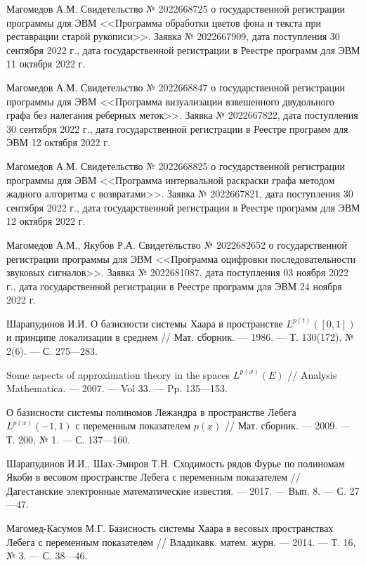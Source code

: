 \begin{thebibliography}{111}
Магомедов А.М.
Свидетельство № 2022668725 о государственной регистрации программы для ЭВМ <<Программа обработки цветов фона и текста при реставрации старой рукописи>>. Заявка № 2022667909, дата поступления 30 сентября 2022 г., дата государственной регистрации в Реестре программ для ЭВМ 11 октября 2022 г.

Магомедов А.М.
Свидетельство № 2022668847 о государственной регистрации программы для ЭВМ <<Программа визуализации взвешенного двудольного графа без налегания реберных меток>>. Заявка № 2022667822, дата поступления 30 сентября 2022 г., дата государственной регистрации в Реестре программ для ЭВМ 12 октября 2022 г.

Магомедов А.М.
Свидетельство № 2022668825 о государственной регистрации программы для ЭВМ <<Программа интервальной раскраски графа методом жадного алгоритма с возвратами>>.
Заявка № 2022667821, дата поступления 30 сентября 2022 г., дата государственной регистрации в Реестре программ для ЭВМ 12 октября 2022 г.

Магомедов А.М., Якубов Р.А.
Свидетельство № 2022682652 о государственной регистрации программы для ЭВМ <<Программа оцифровки последовательности звуковых сигналов>>.
Заявка № 2022681087, дата поступления 03 ноября 2022 г., дата государственной регистрации в Реестре программ для ЭВМ 24 ноября 2022 г.



Шарапудинов И.И.
О базисности системы Хаара в пространстве $L^{p(t)}([0,1])$ и принципе локализации в среднем
//
Мат. сборник.
--- 1986.
--- Т. 130(172), № 2(6).
--- С. 275---283.

Some aspects of approximation theory in the spaces $L^{p(x)}(E)$
//
Analysis Mathematica.
--- 2007.
--- Vol 33.
--- Pp. 135---153.

О базисности системы полиномов Лежандра в пространстве Лебега $L^{p(x)}(-1,1)$ с переменным показателем $p(x)$
//
Мат. сборник.
--- 2009.
--- Т. 200, № 1.
--- С. 137---160.

Шарапудинов И.И., Шах-Эмиров Т.Н.
Сходимость рядов Фурье по полиномам Якоби в весовом пространстве Лебега с переменным показателем
//
Дагестанские электронные математические известия.
--- 2017.
--- Вып. 8.
--- С. 27---47.

Магомед-Касумов М.Г.
Базисность системы Хаара в весовых пространствах Лебега с переменным показателем
//
Владикавк. матем. журн.
--- 2014.
--- Т. 16, № 3.
--- С. 38---46.


\end{thebibliography}
